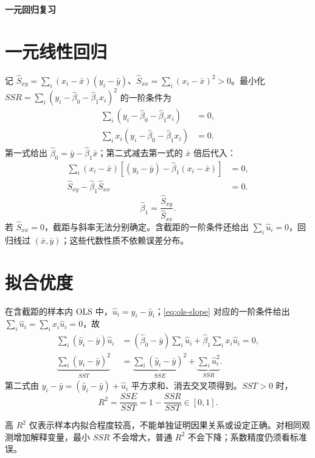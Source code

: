 \documentclass[12pt,a4paper,fontset=none]{ctexart}
\begin{document}
\begin{center}{\LARGE\bfseries 一元回归复习}\end{center}
\tableofcontents
\section{一元线性回归}\label{sec:ols-slope}
\label{sec:prf-srf}
\label{sec:foc}
\begin{proofbox}[title=推导]
记 $\hat S_{xy}=\sum_i(x_i-\bar x)(y_i-\bar y)$、$\hat S_{xx}=\sum_i(x_i-\bar x)^2>0$。最小化 $SSR=\sum_i(y_i-\hat\beta_0-\hat\beta_1x_i)^2$ 的一阶条件为
\begin{align*}
\sum_i(y_i-\hat\beta_0-\hat\beta_1x_i)&=0,\\
\sum_ix_i(y_i-\hat\beta_0-\hat\beta_1x_i)&=0.
\end{align*}
第一式给出 $\hat\beta_0=\bar y-\hat\beta_1\bar x$；第二式减去第一式的 $\bar x$ 倍后代入：
\begin{align*}
\sum_i(x_i-\bar x)[(y_i-\bar y)-\hat\beta_1(x_i-\bar x)]&=0,\\
\hat S_{xy}-\hat\beta_1\hat S_{xx}&=0.
\end{align*}
\begin{equation}
\hat\beta_1=\frac{\hat S_{xy}}{\hat S_{xx}}.\label{eq:ols-slope}
\end{equation}
若 $\hat S_{xx}=0$，截距与斜率无法分别确定。含截距的一阶条件还给出 $\sum_i\hat u_i=0$，回归线过 $(\bar x,\bar y)$；这些代数性质不依赖误差分布。
\end{proofbox}

\section{拟合优度}\label{sec:r-squared}
\label{sec:sst-decomp}
\begin{proofbox}[title=推导]
在含截距的样本内 OLS 中，$\hat u_i=y_i-\hat y_i$；\eqref{eq:ols-slope} 对应的一阶条件给出 $\sum_i\hat u_i=\sum_ix_i\hat u_i=0$，故
\begin{align*}
\sum_i(\hat y_i-\bar y)\hat u_i
&=(\hat\beta_0-\bar y)\sum_i\hat u_i+\hat\beta_1\sum_ix_i\hat u_i=0,\\
\underbrace{\sum_i(y_i-\bar y)^2}_{SST}
&=\underbrace{\sum_i(\hat y_i-\bar y)^2}_{SSE}+\underbrace{\sum_i\hat u_i^2}_{SSR}.
\end{align*}
第二式由 $y_i-\bar y=(\hat y_i-\bar y)+\hat u_i$ 平方求和、消去交叉项得到。$SST>0$ 时，
\begin{equation}
R^2=\frac{SSE}{SST}=1-\frac{SSR}{SST}\in[0,1].\label{eq:r-squared}
\end{equation}
\end{proofbox}
\label{sec:r2-misread}
高 $R^2$ 仅表示样本内拟合程度较高，不能单独证明因果关系或设定正确。对相同观测增加解释变量，最小 $SSR$ 不会增大，普通 $R^2$ 不会下降；系数精度仍须看标准误。
\end{document}
